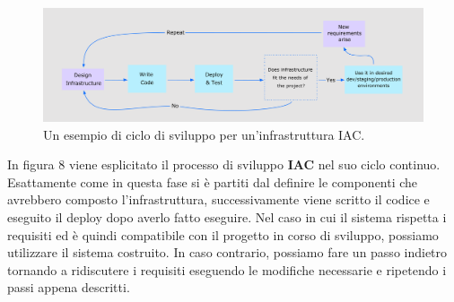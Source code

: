 \documentclass[a4paper,12pt]{report}
\begin{document}
\begin{figure}[h]
	\includegraphics[width=1.0\textwidth]{iac_workflow}
    \caption{Un esempio di ciclo di sviluppo per un'infrastruttura IAC.\cite{iac_img_workflow}}
    \label{fig:push_modifica}
\end{figure}
\newline In figura 8 viene esplicitato il processo di sviluppo \textbf{IAC} nel suo ciclo continuo. Esattamente come in questa fase si è partiti dal definire le componenti che avrebbero composto l'infrastruttura, successivamente viene scritto il codice e eseguito il deploy dopo averlo fatto eseguire. Nel caso in cui il sistema rispetta i requisiti ed è quindi compatibile con il progetto in corso di sviluppo, possiamo utilizzare il sistema costruito. In caso contrario, possiamo fare un passo indietro tornando a ridiscutere i requisiti eseguendo le modifiche necessarie e ripetendo i passi appena descritti.\\
\end{document}
